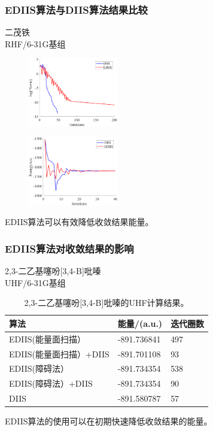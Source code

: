 \documentclass[10pt,aspectratio=43,mathserif,UTF8]{beamer}
\begin{document}
\begin{frame}
	\frametitle{EDIIS算法与DIIS算法结果比较}
	二茂铁\\
	RHF/6-31G基组
	\begin{figure}[ht!]
		\centering
		\begin{minipage}{0.4\linewidth}
			\centering
			\includegraphics[height=3cm]{figure/ferrocene/logNorm3.png}
			\label{fig:ferrocene:lognorm}
		\end{minipage}
		\begin{minipage}{0.4\linewidth}
			\centering
			\includegraphics[height=3cm]{figure/ferrocene/E3.png}
			\label{fig:ferrocene:E}
		\end{minipage}
		\label{fig:ferrocene}
	\end{figure}
	\centerline{EDIIS算法可以有效降低收敛结果能量。}
\end{frame}

\begin{frame}
	\frametitle{EDIIS算法对收敛结果的影响}
	2,3-二乙基噻吩[3,4-B]吡嗪\\
	UHF/6-31G基组
	\begin{table}[htbp]
		\caption{2,3-二乙基噻吩[3,4-B]吡嗪的UHF计算结果。}\label{table:AA4}
		\setlength{\belowcaptionskip}{7pt}
		\centering
		\begin{tabular}{l l l}
			\toprule
			\textbf{算法}			&\textbf{能量/(a.u.)}	&\textbf{迭代圈数}\\
			\midrule
			EDIIS(能量面扫描）			&-891.736841		&497\\
			EDIIS(能量面扫描）+DIIS		&-891.701108		&93\\
			EDIIS(障碍法）				& -891.734354		&538\\
			EDIIS(障碍法）+DIIS			& -891.734354		&90\\
			DIIS						& -891.580787		&57\\
			\bottomrule
		\end{tabular}
		\vspace{0.2cm}
	\end{table}
	\centerline{EDIIS算法的使用可以在初期快速降低收敛结果的能量。}
\end{frame}
\end{document}

